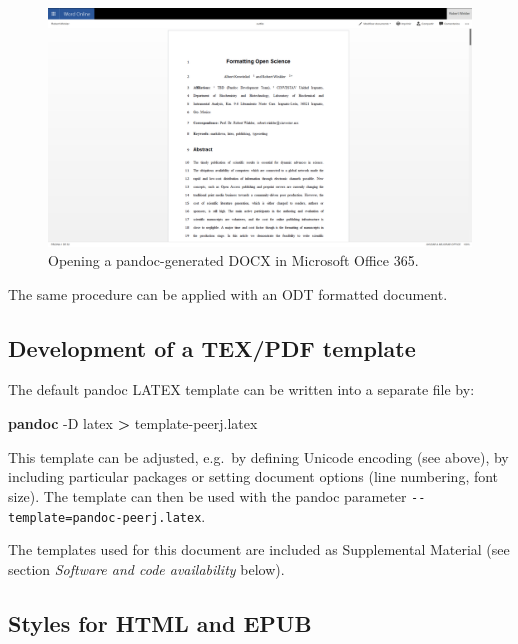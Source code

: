 \documentclass[10pt,fleqn]{wlpeerj}
\newenvironment{Shaded}{}{}
\newcommand{\KeywordTok}[1]{\textcolor[rgb]{0.00,0.44,0.13}{\textbf{{#1}}}}
\newcommand{\NormalTok}[1]{{#1}}
\begin{document}
\begin{figure}[htbp]
\centering
\includegraphics{fig-DOCX-document-in-O365.png}
\caption{Opening a pandoc-generated DOCX in Microsoft Office 365.}
\end{figure}

The same procedure can be applied with an ODT formatted document.

\subsection{Development of a TEX/PDF
template}\label{development-of-a-texpdf-template}

The default pandoc LATEX template can be written into a separate file
by:

\begin{Shaded}
\begin{Highlighting}[]
\KeywordTok{pandoc} \NormalTok{-D latex }\KeywordTok{>} \NormalTok{template-peerj.latex}
\end{Highlighting}
\end{Shaded}

This template can be adjusted, e.g.~by defining Unicode encoding (see
above), by including particular packages or setting document options
(line numbering, font size). The template can then be used with the
pandoc parameter \texttt{-\/-template=pandoc-peerj.latex}.

The templates used for this document are included as Supplemental
Material (see section \emph{Software and code availability} below).

\subsection{Styles for HTML and EPUB}\label{styles-for-html-and-epub}
\end{document}
